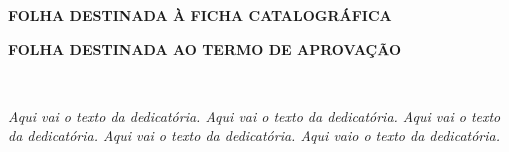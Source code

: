 \documentclass[a4paper,12pt]{report}%
\begin{document}
\newpage

%

\thispagestyle{empty}

\mbox{}

\vspace{14.5cm}

\begin{center}
  {\Large \textnormal{\textbf{FOLHA DESTINADA À FICHA CATALOGRÁFICA}} }
\end{center}



\newpage

%
%

\thispagestyle{empty}

\begin{center}
	{\Large \textnormal{\textbf{FOLHA DESTINADA AO TERMO DE APROVA\c{C}\~AO}} }
\end{center}



\newpage


%
%
\thispagestyle{empty}

\mbox{ } 

\vspace{20cm} %

\begin{flushright}
 \hspace{6cm}
 \begin{minipage}[t]{12cm}
  {\normalsize
   \begin{singlespace}
    \hspace{0.5cm} 
     {\it 
     Aqui vai o texto da dedicatória. Aqui vai o texto da dedicatória. Aqui vai o texto da dedicatória. Aqui vai o texto da dedicatória. Aqui vaio o texto da dedicatória. 
     }
   \end{singlespace}
  }
 \end{minipage}
\end{flushright}
\end{document}
